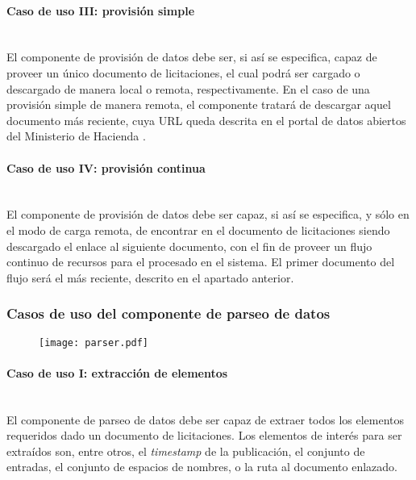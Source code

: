             \paragraph{Caso de uso III: provisión simple} \mbox{}\\
                El componente de provisión de datos debe ser, si así se especifica, capaz de proveer un único documento de licitaciones, el cual podrá ser cargado o descargado de manera local o remota, respectivamente. En el caso de una provisión simple de manera remota, el componente tratará de descargar aquel documento más reciente, cuya URL \cite{LICIDIA} queda descrita en el portal de datos abiertos del Ministerio de Hacienda \cite{PORTALHAC}.
                
            \paragraph{Caso de uso IV: provisión continua} \mbox{}\\
                El componente de provisión de datos debe ser capaz, si así se especifica, y sólo en el modo de carga remota, de encontrar en el documento de licitaciones siendo descargado el enlace al siguiente documento, con el fin de proveer un flujo continuo de recursos para el procesado en el sistema. El primer documento del flujo será el más reciente, descrito en el apartado anterior.
                
        \subsubsection{Casos de uso del componente de parseo de datos}
    
            \begin{figure}[h]
                \centering
                \texttt{[image: parser.pdf]}
                \label{fig:parser}
            \end{figure}
            
            \paragraph{Caso de uso I: extracción de elementos} \mbox{}\\
                El componente de parseo de datos debe ser capaz de extraer todos los elementos requeridos dado un documento de licitaciones. Los elementos de interés para ser extraídos son, entre otros, el \textit{timestamp} de la publicación, el conjunto de entradas, el conjunto de espacios de nombres, o la ruta al documento enlazado.
                
